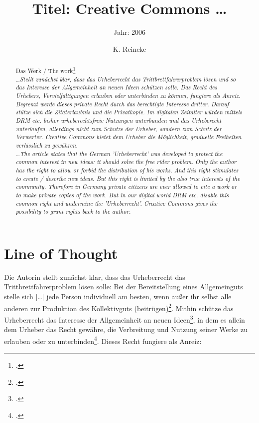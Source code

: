\documentclass[DIV=calc,BCOR=5mm,11pt,headings=small,oneside,abstract=true, toc=bib]{scrartcl}
\begin{document}

\titlehead{Literaturexzerpt}
\subject{Autor(en): Euler}
\title{Titel: Creative Commons \ldots}
\subtitle{Jahr: 2006 }
\author{K. Reincke}

\maketitle

\begin{abstract}
\noindent

Das Werk / The work\footcite[][]{Euler2006a} \\
\noindent \itshape
\ldots Stellt zunächst klar, dass das Urheberrecht das Trittbrettfahrerproblem
lösen und so das Interesse der Allgemeinheit an neuen Ideen schützen solle. Das
Recht des Urhebers, Vervielfältigungen erlauben oder unterbinden zu können,
fungiere als Anreiz. Begrenzt werde dieses private Recht durch das berechtigte
Interesse dritter. Darauf stütze sich die Zitaterlaubnis und die Privatkopie. Im
digitalen Zeitalter würden mittels DRM etc. bisher urheberechtsfreie Nutzungen
unterbunden und das Urheberecht unterlaufen, allerdings nicht zum Schutze der
Urheber, sondern zum Schutz der Verwerter. Creative Commons bietet dem Urheber
die Möglichkeit, graduelle Freiheiten verlässlich zu gewähren.\\
\noindent
\ldots The article states that the German 'Urheberrecht' was developed to
protect the common interest in new ideas: it should solve the free rider
problem. Only the author has the right to allow or forbid the distribution of
his works. And this right stimulates to create / describe new ideas. But this
right is limited by the also true interests of the community. Therefore in
Germany private citizens are ever allowed to cite a work or to make private
copies of the work. But in our digital world DRM etc. disable this common right
and undermine the 'Urheberrecht'. Creative Commons gives the possibility to
grant rights back to the author.
\end{abstract}
\footnotesize
\normalsize

\section{Line of Thought}

Die Autorin stellt zunächst klar, dass das Urheberrecht das
\glqq{}Trittbrettfahrerproblem\grqq{} lösen solle: Bei der Bereitstellung eines
\glqq{}Allgemeinguts\grqq{} stelle sich \glqq{}[\ldots] jede Person
individuell am besten, wenn außer ihr selbst alle anderen zur
Produktion des Kollektivguts (beitrügen)\grqq{}\footcite[vgl.][149]{Euler2006a}.
Mithin schütze das Urheberrecht das \glqq{}Interesse der Allgemeinheit an
neuen Ideen\grqq{}\footcite[vgl.][149]{Euler2006a}, in dem es allein
dem Urheber das Recht gewähre, die Verbreitung und Nutzung seiner Werke zu
erlauben oder zu unterbinden\footcite[vgl.][148]{Euler2006a}. Dieses Recht
fungiere als Anreiz:
\end{document}
